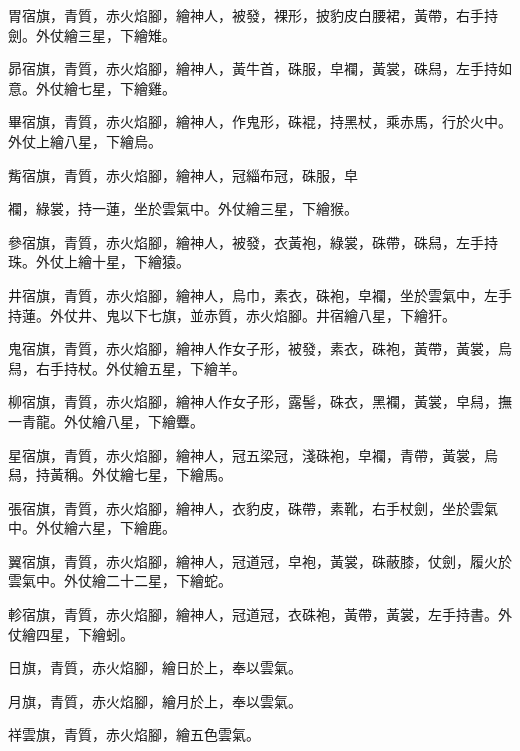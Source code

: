 \begin{pinyinscope}
 胃宿旗，青質，赤火焰腳，繪神人，被發，裸形，披豹皮白腰裙，黃帶，右手持劍。外仗繪三星，下繪雉。



 昴宿旗，青質，赤火焰腳，繪神人，黃牛首，硃服，皁襴，黃裳，硃舄，左手持如意。外仗繪七星，下繪雞。



 畢宿旗，青質，赤火焰腳，繪神人，作鬼形，硃裩，持黑杖，乘赤馬，行於火中。外仗上繪八星，下繪烏。



 觜宿旗，青質，赤火焰腳，繪神人，冠緇布冠，硃服，皁



 襴，綠裳，持一蓮，坐於雲氣中。外仗繪三星，下繪猴。



 參宿旗，青質，赤火焰腳，繪神人，被發，衣黃袍，綠裳，硃帶，硃舄，左手持珠。外仗上繪十星，下繪猿。



 井宿旗，青質，赤火焰腳，繪神人，烏巾，素衣，硃袍，皁襴，坐於雲氣中，左手持蓮。外仗井、鬼以下七旗，並赤質，赤火焰腳。井宿繪八星，下繪犴。



 鬼宿旗，青質，赤火焰腳，繪神人作女子形，被發，素衣，硃袍，黃帶，黃裳，烏舄，右手持杖。外仗繪五星，下繪羊。



 柳宿旗，青質，赤火焰腳，繪神人作女子形，露髻，硃衣，黑襴，黃裳，皁舄，撫一青龍。外仗繪八星，下繪麞。



 星宿旗，青質，赤火焰腳，繪神人，冠五梁冠，淺硃袍，皁襴，青帶，黃裳，烏舄，持黃稱。外仗繪七星，下繪馬。



 張宿旗，青質，赤火焰腳，繪神人，衣豹皮，硃帶，素靴，右手杖劍，坐於雲氣中。外仗繪六星，下繪鹿。



 翼宿旗，青質，赤火焰腳，繪神人，冠道冠，皁袍，黃裳，硃蔽膝，仗劍，履火於雲氣中。外仗繪二十二星，下繪蛇。



 軫宿旗，青質，赤火焰腳，繪神人，冠道冠，衣硃袍，黃帶，黃裳，左手持書。外仗繪四星，下繪蚓。



 日旗，青質，赤火焰腳，繪日於上，奉以雲氣。



 月旗，青質，赤火焰腳，繪月於上，奉以雲氣。



 祥雲旗，青質，赤火焰腳，繪五色雲氣。




\end{pinyinscope}
